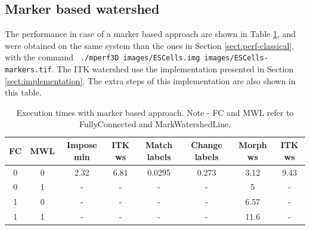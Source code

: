 \documentclass{InsightArticle}
\begin{document}
\subsection{Marker based watershed}
\label{sect:perf-marker}
The performance in case of a marker based approach are shown in Table
\ref{tbl:perf-marker}, and were obtained on the same system than the
ones in Section \ref{sect:perf-classical}, with the command {\tt 
./mperf3D images/ESCells.img images/ESCells-markers.tif}.
The ITK watershed use the implementation presented in Section
\ref{sect:implementation}. The extra steps of this implementation are
also shown in this table.

\begin{table}[htbp]
\centering
\begin{tabular}{cc|cccc|cc}
\hline
FC & MWL & Impose min &  ITK ws & Match labels & Change labels & Morph ws & ITK ws \\
\hline
\hline
0 &      0 &      2.32 &   6.81 &   0.0295 & 0.273 &  3.12 &   9.43 \\
0 &      1 &      -    &   -    &   -      & -     &  5    &   - \\
1 &      0 &      -    &   -    &   -      & -     &  6.57 &   - \\
1 &      1 &      -    &   -    &   -      & -     &  11.6 &   - \\
\hline
\end{tabular}
\caption{Execution times with marker based approach. Note - FC and MWL refer to FullyConnected and MarkWatershedLine.\label{tbl:perf-marker}}
\end{table}
\end{document}
